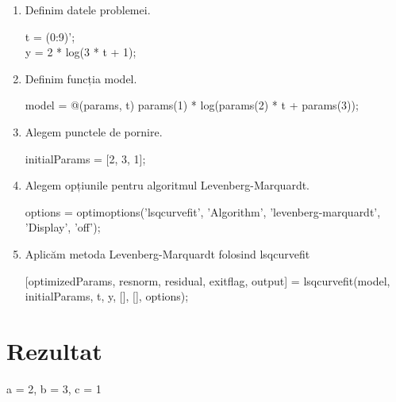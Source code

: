\documentclass{article}
\begin{document}
\begin{center}
\begin{enumerate}
\item  Definim datele problemei. \\
\begin{center}
t = (0:9)'; \\
y = 2 * log(3 * t + 1); \\
\end{center}
\item Definim funcția model. \\
 \begin{center}
    model = @(params, t) params(1) * log(params(2) * t + params(3));
 \end{center}
\item Alegem punctele de pornire.\\
 \begin{center}
     initialParams = [2, 3, 1];
 \end{center}
 \item Alegem opțiunile pentru algoritmul Levenberg-Marquardt.\\
 \begin{center}
    options = optimoptions('lsqcurvefit', 'Algorithm', 'levenberg-marquardt', 'Display', 'off');
 \end{center}
  \item Aplicăm metoda Levenberg-Marquardt folosind lsqcurvefit\\
 \begin{center}
    [optimizedParams, resnorm, residual, exitflag, output] = lsqcurvefit(model, initialParams, t, y, [], [], options);
 \end{center}
\end{enumerate}
\end{center}

\section*{Rezultat}
\begin{center}
a = 2, b = 3, c = 1
\end{center}
\end{document}
